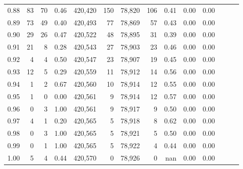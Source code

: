 \begin{tabular}{rrrrrrrrrrrrrr}
0.88 &      83 &     70 &  0.46 &  420,420 &      150 &  78,820 &     106 &  0.41 &  0.00 &      0.00 \\
0.89 &      73 &     49 &  0.40 &  420,493 &       77 &  78,869 &      57 &  0.43 &  0.00 &      0.00 \\
0.90 &      29 &     26 &  0.47 &  420,522 &       48 &  78,895 &      31 &  0.39 &  0.00 &      0.00 \\
0.91 &      21 &      8 &  0.28 &  420,543 &       27 &  78,903 &      23 &  0.46 &  0.00 &      0.00 \\
0.92 &       4 &      4 &  0.50 &  420,547 &       23 &  78,907 &      19 &  0.45 &  0.00 &      0.00 \\
0.93 &      12 &      5 &  0.29 &  420,559 &       11 &  78,912 &      14 &  0.56 &  0.00 &      0.00 \\
0.94 &       1 &      2 &  0.67 &  420,560 &       10 &  78,914 &      12 &  0.55 &  0.00 &      0.00 \\
0.95 &       1 &      0 &  0.00 &  420,561 &        9 &  78,914 &      12 &  0.57 &  0.00 &      0.00 \\
0.96 &       0 &      3 &  1.00 &  420,561 &        9 &  78,917 &       9 &  0.50 &  0.00 &      0.00 \\
0.97 &       4 &      1 &  0.20 &  420,565 &        5 &  78,918 &       8 &  0.62 &  0.00 &      0.00 \\
0.98 &       0 &      3 &  1.00 &  420,565 &        5 &  78,921 &       5 &  0.50 &  0.00 &      0.00 \\
0.99 &       0 &      1 &  1.00 &  420,565 &        5 &  78,922 &       4 &  0.44 &  0.00 &      0.00 \\
1.00 &       5 &      4 &  0.44 &  420,570 &        0 &  78,926 &       0 &   nan &  0.00 &      0.00 \\
\bottomrule
\end{tabular}
